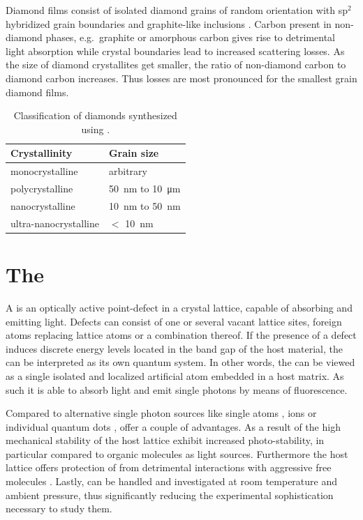     Diamond films consist of isolated diamond grains of random orientation with sp$^2$ hybridized grain boundaries and graphite-like inclusions \cite{Riedrich-moller2014}. Carbon present in non-diamond phases, e.g.\ graphite or amorphous carbon gives rise to detrimental light absorption while crystal boundaries lead to increased scattering losses. As the size of diamond crystallites get smaller, the ratio of non-diamond carbon to diamond carbon increases. Thus losses are most pronounced for the smallest grain diamond films. 

    \begin{table}[htbp]
        \centering
  			\begin{tabular}{@{} ll @{}}
  			\toprule
  			Crystallinity & Grain size  \\
  			\midrule
  			monocrystalline & arbitrary \\
  			polycrystalline & \SI{50}{\nm} to \SI{10}{\micro\meter} \\
  			nanocrystalline & \SI{10}{\nm} to \SI{50}{\nm} \\
  			ultra-nanocrystalline & $<$ \SI{10}{\nm} \\
  			\bottomrule
  			\end{tabular}
        \caption[Classification of diamond synthesized by \cvd]{Classification of diamonds synthesized using \CVD \cite{Steinmetz2011}.} \label{tab::diamond_grain_sizes}
  	\end{table}

\section{The \SIV} \label{sec::siv}

  A \cc is an optically active point-defect in a crystal lattice, capable of absorbing and emitting light. Defects can consist of one or several vacant lattice sites, foreign atoms replacing lattice atoms or a combination thereof. If the presence of a defect induces discrete energy levels located in the band gap of the host material, the \cc can be interpreted as its own quantum system. In other words, the \cc can be viewed as a single isolated and localized artificial atom embedded in a host matrix. As such it is able to absorb light and emit single photons by means of fluorescence.

  Compared to alternative single photon sources like single atoms \cite{Kuhn2002}, ions \cite{Keller2004} or individual quantum dots \cite{Michler2000, Yuan2002}, \ccs offer a couple of advantages. As a result of the high mechanical stability of the host lattice \ccs exhibit increased photo-stability, in particular compared to organic molecules as light sources. Furthermore the host lattice offers protection of \ccs from detrimental interactions with aggressive free molecules \cite{Lounis2005}. Lastly, \ccs can be handled and investigated at room temperature and ambient pressure, thus significantly reducing the experimental sophistication necessary to study them.

